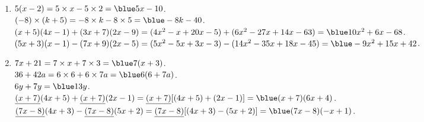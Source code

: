 \ \\ [-5mm]
   \begin{enumerate}
      \item $5(x-2) =5\times x-5\times2 ={\blue 5x-10}$. \\
         $(-8)\times (k+5) =-8\times k-8\times5 ={\blue -8k-40}$. \\
         $(x+5)(4x-1) + (3x+7)(2x-9) =(4x^2-x+20x-5)+(6x^2-27x+14x-63) ={\blue 10x^2+6x-68}$. \\
         $(5x+3)(x-1) -(7x+9)(2x-5) =(5x^2-5x+3x-3)-(14x^2-35x+18x-45) ={\blue -9x^2+15x+42}$.
      \item $7x + 21 =7\times x+7\times3 ={\blue 7(x+3)}$. \\
         $36+42 a =6\times6+6\times7a ={\blue 6(6+7a)}$. \\
         $6y+7y ={\blue 13y}$. \\
         $\underline{(x+7)}(4x+5) + \underline{(x+7)}(2x-1) =\underline{(x+7)}[(4x+5)+(2x-1)] ={\blue (x+7)(6x+4)}$. \\
         $\underline{(7x-8)}(4x+3)-\underline{(7x-8)}(5x+2) =\underline{(7x-8)}[(4x+3)-(5x+2)] ={\blue (7x-8)(-x+1)}$.
   \end{enumerate}
